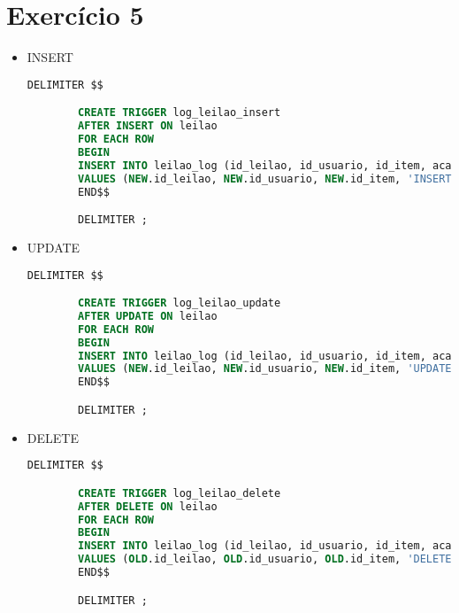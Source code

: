 \documentclass{article}
\begin{document}
\section*{Exercício 5}

\begin{itemize}

    \item INSERT
    \begin{lstlisting}[language=SQL]
        DELIMITER $$

        CREATE TRIGGER log_leilao_insert
        AFTER INSERT ON leilao
        FOR EACH ROW
        BEGIN
        INSERT INTO leilao_log (id_leilao, id_usuario, id_item, acao, hora, lance, usuario_bd) 
        VALUES (NEW.id_leilao, NEW.id_usuario, NEW.id_item, 'INSERT', NOW(), NEW.lance, CURRENT_USER());
        END$$

        DELIMITER ;

    \end{lstlisting}

    \item UPDATE
    \begin{lstlisting}[language=SQL]
        DELIMITER $$

        CREATE TRIGGER log_leilao_update
        AFTER UPDATE ON leilao
        FOR EACH ROW
        BEGIN
        INSERT INTO leilao_log (id_leilao, id_usuario, id_item, acao, hora, lance, usuario_bd) 
        VALUES (NEW.id_leilao, NEW.id_usuario, NEW.id_item, 'UPDATE', NOW(), NEW.lance, CURRENT_USER());
        END$$

        DELIMITER ;
    \end{lstlisting}

    \item DELETE
    \begin{lstlisting}[language=SQL]
        DELIMITER $$

        CREATE TRIGGER log_leilao_delete
        AFTER DELETE ON leilao
        FOR EACH ROW
        BEGIN
        INSERT INTO leilao_log (id_leilao, id_usuario, id_item, acao, hora, lance, usuario_bd) 
        VALUES (OLD.id_leilao, OLD.id_usuario, OLD.id_item, 'DELETE', NOW(), OLD.lance, CURRENT_USER());
        END$$

        DELIMITER ;
    \end{lstlisting}

\end{itemize}
\end{document}
